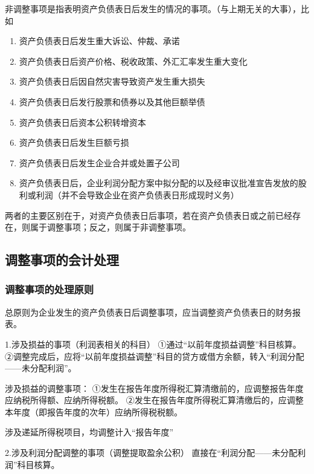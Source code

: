 \documentclass[UTF8,12pt]{ctexart}
\numberwithin{equation}{section} %
\numberwithin{figure}{section}
\numberwithin{table}{section}
\begin{document}
	非调整事项是指表明资产负债表日后发生的情况的事项。（与上期无关的大事），比如
	\begin{enumerate}
		\item 资产负债表日后发生重大诉讼、仲裁、承诺
		
		\item 资产负债表日后资产价格、税收政策、外汇汇率发生重大变化
		
		\item 资产负债表日后因自然灾害导致资产发生重大损失
		
		\item 资产负债表日后发行股票和债券以及其他巨额举债
		
		\item 资产负债表日后资本公积转增资本
		
		\item 资产负债表日后发生巨额亏损
		
		\item 资产负债表日后发生企业合并或处置子公司
		
		\item 资产负债表日后，企业利润分配方案中拟分配的以及经审议批准宣告发放的股利或利润（并不会导致企业在资产负债表日形成现时义务）
	\end{enumerate}
	
	两者的主要区别在于，对资产负债表日后事项，若在资产负债表日或之前已经存在，则属于调整事项；反之，则属于非调整事项。
	
	\subsection{调整事项的会计处理}
	\subsubsection{调整事项的处理原则}
	总原则为企业发生的资产负债表日后调整事项，应当调整资产负债表日的财务报表。
	
	1.涉及损益的事项（利润表相关的科目）
	①通过“以前年度损益调整”科目核算。
	②调整完成后，应将“以前年度损益调整”科目的贷方或借方余额，转入“利润分配——未分配利润”。
	
	涉及损益的调整事项：
	①发生在报告年度所得税汇算清缴前的，应调整报告年度应纳税所得额、应纳所得税额。
	②发生在报告年度所得税汇算清缴后的，应调整本年度（即报告年度的次年）应纳所得税税额。
	
	涉及递延所得税项目，均调整计入“报告年度”
	
	2.涉及利润分配调整的事项（调整提取盈余公积）
	直接在“利润分配——未分配利润”科目核算。
	
\end{document}
